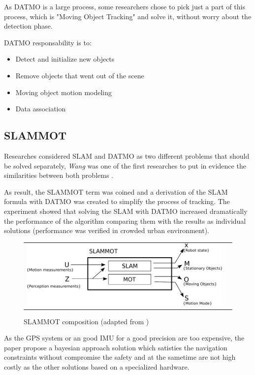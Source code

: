 As DATMO is a large process, some researchers chose to pick just a part of this process, which is "Moving Object Tracking" and solve it, without worry about the detection phase.

DATMO responsability is to:

\begin{itemize}
\item Detect and initialize new objects
\item Remove objects that went out of the scene
\item Moving object motion modeling
\item Data association
\end{itemize}



\subsection{SLAMMOT}

Researches considered SLAM and DATMO as two different problems that should be solved separately, \textit{Wang} was one of the first researches to put in evidence the similarities between both problems \cite{Wang03onlinesimultaneous}.

As result, the SLAMMOT term was coined and a derivation of the SLAM formula with DATMO was created to simplify the process of tracking. The experiment showed that solving the SLAM with DATMO increased dramatically the performance of the algorithm comparing them with the results as individual solutions (performance was verified in crowded urban environment).

\begin{figure}[h]
   \centering
     \begin{tabular}{lr}
       \includegraphics[scale=0.9]{img/fig:slammot}
     \end{tabular}
   \caption{SLAMMOT composition (adapted from \cite{Wang04a})}
   \label{fig:slammot}
 \end{figure}

As the GPS system or an good IMU for a good precision are too expensive, the paper propose a bayesian approach solution which satisties the navigation constraints without compromise the safety and at the sametime are not high costly as the other solutions based on a specialized hardware.

